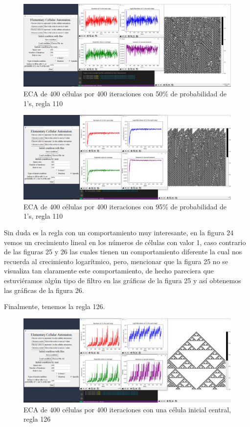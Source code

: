 \documentclass[11pt]{article}
\begin{document}
		\begin{figure}[H]
			\centering
			\includegraphics[scale=0.26]{resources/add14.png}
			\caption{ECA de 400 células por 400 iteraciones con 50\% de probabilidad de 1's, regla 110}								\label{fig:picture}
		\end{figure}
		\begin{figure}[H]
			\centering
			\includegraphics[scale=0.26]{resources/add15.png}
			\caption{ECA de 400 células por 400 iteraciones con 95\% de probabilidad de 1's, regla 110}								\label{fig:picture}
		\end{figure}
		Sin duda es la regla con un comportamiento muy interesante, en la figura 24 vemos un crecimiento lineal en los números de células con valor 1, caso contrario de las figuras 25 y 26 las cuales tienen un comportamiento diferente la cual nos recuerda al crecimiento logarítmico, pero, mencionar que la figura 25 no se visualiza tan claramente este comportamiento, de hecho pareciera que estuviéramos algún tipo de filtro en las gráficas de la figura 25 y así obtenemos las gráficas de la figura 26.\par
		Finalmente, tenemos la regla 126.
		\begin{figure}[H]
			\centering
			\includegraphics[scale=0.26]{resources/add16.png}
			\caption{ECA de 400 células por 400 iteraciones con una célula inicial central, regla 126}								\label{fig:picture}
		\end{figure}
\end{document}
